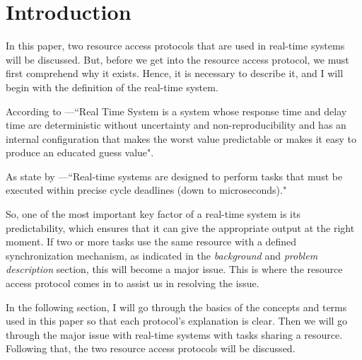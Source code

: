 \section{Introduction}

In this paper, two resource access protocols that are  used in real-time systems will be discussed. But, before we get into the resource access protocol, we must first comprehend why it exists. Hence, it is necessary to describe it, and I will begin with the definition of the real-time system.\par 

According to \cite{b1}---``Real Time System is a system whose response time and delay time are deterministic without uncertainty and non-reproducibility and has an internal configuration that makes the worst value predictable or makes it easy to produce an educated guess value".\par

As state by \cite{b2}---``Real-time systems are designed to perform tasks that must be executed within precise cycle deadlines (down to microseconds)."

So, one of the most important key factor of a real-time system is its predictability, which ensures that it can give the appropriate output at the right moment. If two or more tasks use the same resource with a defined synchronization mechanism, as indicated in the \textit{background} and \textit{problem description} section, this will become a major issue. This is where the resource access protocol comes in to assist us in resolving the issue. \par

In the following section, I will go through the basics of the concepts and terms used in this paper so that each protocol's explanation is clear. Then we will go through the major issue with real-time systems with tasks sharing a resource. Following that, the two resource access protocols will be discussed.\par
 





